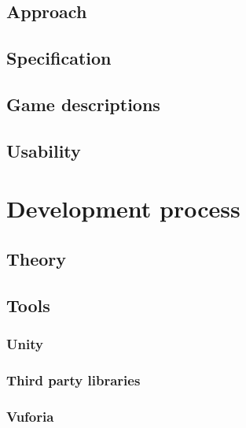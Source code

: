 \documentclass[BSP,english,oneside]{classes/gucthesis}
\begin{document}
	\chapter{Approach}
		\label{chap:approach}
		

	\chapter{Specification}
		\label{chap:specification}
		

	\chapter{Game descriptions}
		\label{chap:game_descriptions}
		

	\chapter{Usability}
		\label{chap:usability}
		


\part{Development process}

	\chapter{Theory}
		\label{chap:theory}

	\chapter{Tools}
		\label{chap:tools}

		\section{Unity}
			\label{chap:unity}
			

		\section{Third party libraries}
			\label{chap:third_party_libraries}
			

		\section{Vuforia}
			\label{chap:vuforia}
			
\end{document}
